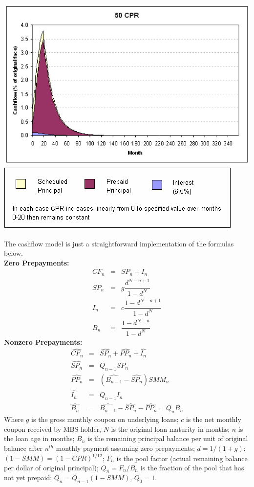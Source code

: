 \documentclass[10pt,letterpaper]{article}
\begin{document}
\begin{center}
\includegraphics[scale=0.3]{50CPRchart.png}\\
\includegraphics[scale=0.4]{legendCPR.png}\\
\end{center}
The cashflow model is just a straightforward implementation of the formulas below.\\
\textbf{Zero Prepayments:}
\begin{eqnarray}
CF_n & = & SP_n + I_n\\
SP_n & = & g \dfrac{d^{N-n+1}}{1-d^N}\\
I_n & = & c \dfrac{1 - d^{N-n+1}}{1-d^N}\\
B_n & = & \dfrac{1-d^{N-n}}{1-d^N}
\end{eqnarray}
\textbf{Nonzero Prepayments:}
\begin{eqnarray}
\hat{CF_n} & = & \hat{SP_n} + \hat{PP_n} + \hat{I_n}\\
\hat{SP_n} & = & Q_{n-1} SP_n\\
\hat{PP_n} & = & (\hat{B_{n-1}} - \hat{SP_n})SMM_n\\
\hat{I_n} & = & Q_{n-1}I_n\\
\label{burnoutb} \hat{B_n} & = & \hat{B_{n-1}} - \hat{SP_n} - \hat{PP_n} = Q_n B_n
\end{eqnarray}
Where $g$ is the gross monthly coupon on underlying loans; $c$ is the net monthly coupon received by MBS holder, $N$ is the original loan maturity in months; $n$ is the loan age in months; $B_n$ is the remaining principal balance per unit of original balance after $n^{th}$ monthly payment assuming zero prepayments; $ d = 1/(1 + g)$; $ (1 - SMM) = (1 - CPR)^{1/12}$; $F_n$ is the pool factor (actual remaining balance per dollar of original principal); $Q_n = F_n / B_n$ is the fraction of the pool that has not yet prepaid; $Q_n = Q_{n-1} (1 - SMM)$, $Q_0 = 1$.\\
\end{document}
